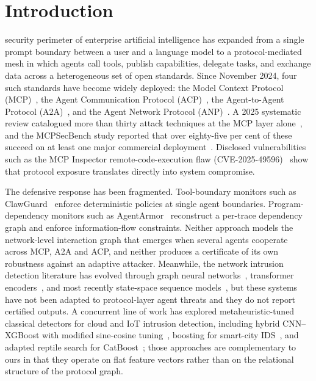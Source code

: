 \documentclass{ieeeaccess}
\begin{document}
\section{Introduction}
\label{sec:intro}
 security perimeter of enterprise artificial intelligence has expanded from a single prompt boundary between a user and a language model to a protocol-mediated mesh in which agents call tools, publish capabilities, delegate tasks, and exchange data across a heterogeneous set of open standards. Since November 2024, four such standards have become widely deployed: the Model Context Protocol (MCP)~\cite{Anthropic2024MCP}, the Agent Communication Protocol (ACP)~\cite{Ibm2025Acp}, the Agent-to-Agent Protocol (A2A)~\cite{Google2025A2A}, and the Agent Network Protocol (ANP)~\cite{Yan2025ANP}. A 2025 systematic review catalogued more than thirty attack techniques at the MCP layer alone~\cite{Hou2025MCP}, and the MCPSecBench study reported that over eighty-five per cent of these succeed on at least one major commercial deployment~\cite{Yang2025MCPSec}. Disclosed vulnerabilities such as the MCP Inspector remote-code-execution flaw (CVE-2025-49596)~\cite{Qualys2025CVE49596} show that protocol exposure translates directly into system compromise.

The defensive response has been fragmented. Tool-boundary monitors such as ClawGuard~\cite{Zhao2026ClawGuard} enforce deterministic policies at single agent boundaries. Program-dependency monitors such as AgentArmor~\cite{Wang2025AgentArmor} reconstruct a per-trace dependency graph and enforce information-flow constraints. Neither approach models the network-level interaction graph that emerges when several agents cooperate across MCP, A2A and ACP, and neither produces a certificate of its own robustness against an adaptive attacker. Meanwhile, the network intrusion detection literature has evolved through graph neural networks~\cite{Lo2022EGraphSAGE,Caville2022AnomalE}, transformer encoders~\cite{Wu2022RTIDS,Ullah2024IDSINT}, and most recently state-space sequence models~\cite{Wang2025NetMamba,Gu2023Mamba}, but these systems have not been adapted to protocol-layer agent threats and they do not report certified outputs. A concurrent line of work has explored metaheuristic-tuned classical detectors for cloud and IoT intrusion detection, including hybrid CNN--XGBoost with modified sine-cosine tuning~\cite{Salb2023SCACloud}, boosting for smart-city IDS~\cite{Zivkovic2022BoostingSmartCity}, and adapted reptile search for CatBoost~\cite{Zivkovic2023CatBoostReptile,Zivkovic2023IoTSoftware,Bacanin2024MetaverseIDS}; those approaches are complementary to ours in that they operate on flat feature vectors rather than on the relational structure of the protocol graph.
\end{document}
